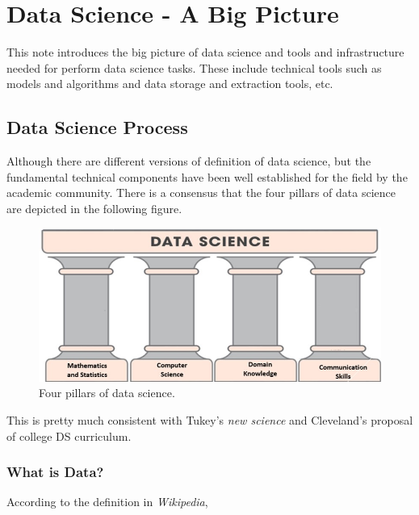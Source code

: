 \documentclass[
]{book}
\begin{document}
\hypertarget{data-science---a-big-picture}{%
\chapter{Data Science - A Big Picture}\label{data-science---a-big-picture}}

This note introduces the big picture of data science and tools and infrastructure needed for perform data science tasks. These include technical tools such as models and algorithms and data storage and extraction tools, etc.

\hypertarget{data-science-process}{%
\section{Data Science Process}\label{data-science-process}}

Although there are different versions of definition of data science, but the fundamental technical components have been well established for the field by the academic community. There is a consensus that the four pillars of data science are depicted in the following figure.

\begin{figure}

{\centering \includegraphics[width=0.9\linewidth]{img01/w01-4pillarsDS} 

}

\caption{Four pillars of data science.}\label{fig:unnamed-chunk-4}
\end{figure}

This is pretty much consistent with Tukey's \emph{new science} and Cleveland's proposal of college DS curriculum.

\hypertarget{what-is-data}{%
\subsection{What is Data?}\label{what-is-data}}

According to the definition in \emph{Wikipedia},
\end{document}
